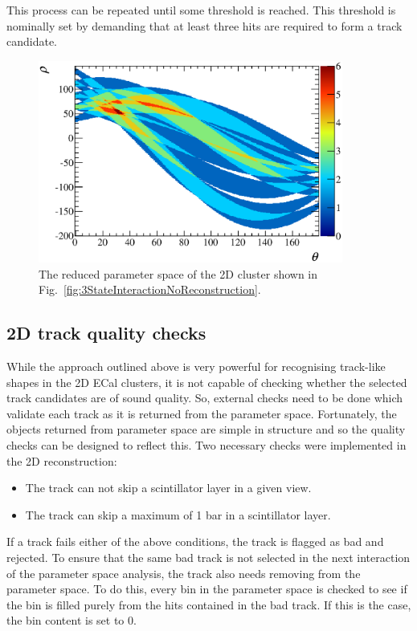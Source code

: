 \newline
\newline
This process can be repeated until some threshold is reached.  This threshold is nominally set by demanding that at least three hits are required to form a track candidate.
\begin{figure}
  \centering
  \includegraphics[width=10cm]{images/ecal_hough_transform/ReducedParameterSpace_3StateInteraction.eps}
  \caption{The reduced parameter space of the 2D cluster shown in Fig.~\ref{fig:3StateInteractionNoReconstruction}.}
  \label{fig:ReducedParameterSpace3StateInteraction}
\end{figure}

\subsection{2D track quality checks}
\label{subsec:2DTrackQualityChecks}
While the approach outlined above is very powerful for recognising track-like shapes in the 2D ECal clusters, it is not capable of checking whether the selected track candidates are of sound quality.  So, external checks need to be done which validate each track as it is returned from the parameter space.  Fortunately, the objects returned from parameter space are simple in structure and so the quality checks can be designed to reflect this.  Two necessary checks were implemented in the 2D reconstruction:
\begin{itemize}
\item The track can not skip a scintillator layer in a given view.
\item The track can skip a maximum of 1 bar in a scintillator layer.
\end{itemize}
If a track fails either of the above conditions, the track is flagged as bad and rejected.  To ensure that the same bad track is not selected in the next interaction of the parameter space analysis, the track also needs removing from the parameter space.  To do this, every bin in the parameter space is checked to see if the bin is filled purely from the hits contained in the bad track.  If this is the case, the bin content is set to 0.  

